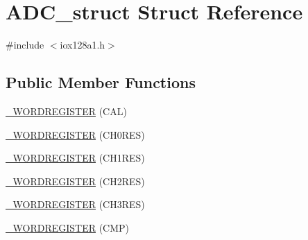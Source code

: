 \hypertarget{struct_a_d_c__struct}{
\section{ADC\_\-struct Struct Reference}
\label{struct_a_d_c__struct}
}


{\ttfamily \#include $<$iox128a1.h$>$}

\subsection*{Public Member Functions}
\begin{DoxyCompactItemize}
\item 
\hyperlink{struct_a_d_c__struct_ab421dc830ed154a2e9acc357023215f9}{\_\-WORDREGISTER} (CAL)
\item 
\hyperlink{struct_a_d_c__struct_aa9eea8eae789e3fbecab731d0993d128}{\_\-WORDREGISTER} (CH0RES)
\item 
\hyperlink{struct_a_d_c__struct_a7524b4641494c231ed83cd93013818c7}{\_\-WORDREGISTER} (CH1RES)
\item 
\hyperlink{struct_a_d_c__struct_a388548845f09fe7a65eff4adb7470536}{\_\-WORDREGISTER} (CH2RES)
\item 
\hyperlink{struct_a_d_c__struct_a8d0eedf8b8c593c56bdc32bca2386443}{\_\-WORDREGISTER} (CH3RES)
\item 
\hyperlink{struct_a_d_c__struct_a49df1732fb867f03722ff17fffcb4e9c}{\_\-WORDREGISTER} (CMP)
\end{DoxyCompactItemize}
